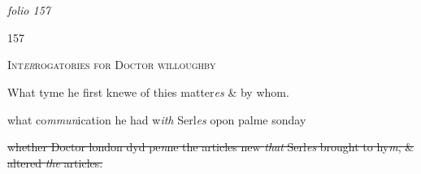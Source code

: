 \documentclass[12pt, a4paper]{book}
\begin{document}
         \vspace*{4cm}
         
\dotfill
						  \section*{}  \subsection*{}

\textit{folio 157}



\begin{flushright}{\color{Mahogany}157}\end{flushright}

            		
				\begin{center} \begin{large} {\scshape Int\textit{er}rogatories for Doctor willoughby} \end{large} \end{center}
			



				\marginpar[\vspace{0.5cm}{\textcolor{Gray}{1}}]{}
			

		\ifthenelse{\isodd{\thepage}}
		{\reversemarginpar}
		{\normalmarginpar}
		What tyme he first knewe of thies matter\textit{es} \& by whom.



				\marginpar[\vspace{0.5cm}{\textcolor{Gray}{2}}]{}
			
	
		\ifthenelse{\isodd{\thepage}}
		{\reversemarginpar}
		{\normalmarginpar}
		what co\textit{mmun}ication he had w\textit{ith} Serl\textit{es} opon palme sonday



			
	
		\ifthenelse{\isodd{\thepage}}
		{\reversemarginpar}
		{\normalmarginpar}
		\sout{whether Doctor london dyd pe\textit{n}ne the articles new
 \textit{that} Serl\textit{es} brought to hy\textit{m}, \& altered \textit{the} articles.}


	
			
\end{document}
